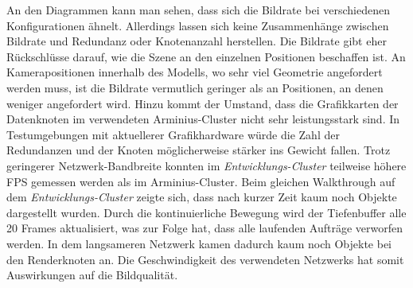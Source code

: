 An den Diagrammen kann man sehen, dass sich die Bildrate bei verschiedenen Konfigurationen ähnelt. Allerdings lassen sich keine Zusammenhänge zwischen Bildrate und Redundanz oder Knotenanzahl herstellen. Die Bildrate gibt eher Rückschlüsse darauf, wie die Szene an den einzelnen Positionen beschaffen ist. An Kamerapositionen innerhalb des Modells, wo sehr viel Geometrie angefordert werden muss, ist die Bildrate vermutlich geringer als an Positionen, an denen weniger angefordert wird. Hinzu kommt der Umstand, dass die Grafikkarten der Datenknoten im verwendeten Arminius-Cluster nicht sehr leistungsstark sind. In Testumgebungen mit aktuellerer Grafikhardware würde die Zahl der Redundanzen und der Knoten möglicherweise stärker ins Gewicht fallen. Trotz geringerer Netzwerk-Bandbreite konnten im \textit{Entwicklungs-Cluster} teilweise höhere FPS gemessen werden als im Arminius-Cluster. Beim gleichen Walkthrough auf dem \textit{Entwicklungs-Cluster} zeigte sich, dass nach kurzer Zeit kaum noch Objekte dargestellt wurden. Durch die kontinuierliche Bewegung wird der Tiefenbuffer alle 20 Frames aktualisiert, was zur Folge hat, dass alle laufenden Aufträge verworfen werden. In dem langsameren Netzwerk kamen dadurch kaum noch Objekte bei den Renderknoten an. Die Geschwindigkeit des verwendeten Netzwerks hat somit Auswirkungen auf die Bildqualität.

